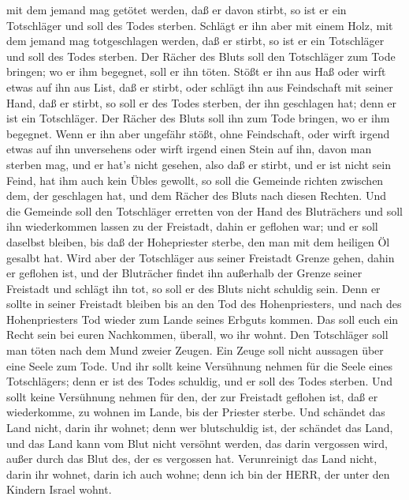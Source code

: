 mit dem jemand mag getötet werden, daß er davon stirbt, so ist er ein
Totschläger und soll des Todes sterben.  Schlägt er ihn
aber mit einem Holz, mit dem jemand mag totgeschlagen werden, daß er
stirbt, so ist er ein Totschläger und soll des Todes sterben.
 Der Rächer des Bluts soll den Totschläger zum Tode
bringen; wo er ihm begegnet, soll er ihn töten.  Stößt er
ihn aus Haß oder wirft etwas auf ihn aus List, daß er stirbt,
 oder schlägt ihn aus Feindschaft mit seiner Hand, daß er
stirbt, so soll er des Todes sterben, der ihn geschlagen hat; denn er
ist ein Totschläger. Der Rächer des Bluts soll ihn zum Tode bringen, wo
er ihm begegnet.  Wenn er ihn aber ungefähr stößt, ohne
Feindschaft, oder wirft irgend etwas auf ihn unversehens 
oder wirft irgend einen Stein auf ihn, davon man sterben mag, und er
hat's nicht gesehen, also daß er stirbt, und er ist nicht sein Feind,
hat ihm auch kein Übles gewollt,  so soll die Gemeinde
richten zwischen dem, der geschlagen hat, und dem Rächer des Bluts nach
diesen Rechten.  Und die Gemeinde soll den Totschläger
erretten von der Hand des Bluträchers und soll ihn wiederkommen lassen
zu der Freistadt, dahin er geflohen war; und er soll daselbst bleiben,
bis daß der Hohepriester sterbe, den man mit dem heiligen Öl gesalbt
hat.  Wird aber der Totschläger aus seiner Freistadt Grenze
gehen, dahin er geflohen ist,  und der Bluträcher findet
ihn außerhalb der Grenze seiner Freistadt und schlägt ihn tot, so soll
er des Bluts nicht schuldig sein.  Denn er sollte in seiner
Freistadt bleiben bis an den Tod des Hohenpriesters, und nach des
Hohenpriesters Tod wieder zum Lande seines Erbguts kommen. 
Das soll euch ein Recht sein bei euren Nachkommen, überall, wo ihr
wohnt.  Den Totschläger soll man töten nach dem Mund zweier
Zeugen. Ein Zeuge soll nicht aussagen über eine Seele zum Tode.
 Und ihr sollt keine Versühnung nehmen für die Seele eines
Totschlägers; denn er ist des Todes schuldig, und er soll des Todes
sterben.  Und sollt keine Versühnung nehmen für den, der
zur Freistadt geflohen ist, daß er wiederkomme, zu wohnen im Lande, bis
der Priester sterbe.  Und schändet das Land nicht, darin
ihr wohnet; denn wer blutschuldig ist, der schändet das Land, und das
Land kann vom Blut nicht versöhnt werden, das darin vergossen wird,
außer durch das Blut des, der es vergossen hat. 
Verunreinigt das Land nicht, darin ihr wohnet, darin ich auch wohne;
denn ich bin der HERR, der unter den Kindern Israel wohnt.

